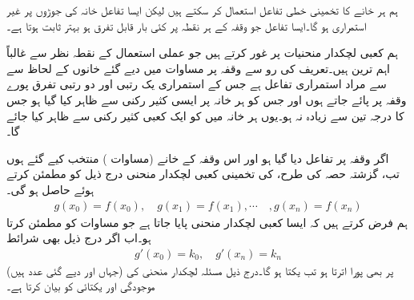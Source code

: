ہم ہر خانے  کا تخمینی خطی تفاعل استعمال کر سکتے ہیں لیکن ایسا تفاعل خانہ کی جوڑوں پر غیر استمراری ہو گا۔ایسا تفاعل جو وقفہ  کے ہر نقطہ پر کئی بار قابل تفرق ہو  بہتر ثابت ہوتا ہے۔

ہم کعبی لچکدار منحنیات پر غور کرتے ہیں جو عملی استعمال کے نقطہ نظر سے غالباً اہم ترین ہیں۔تعریف کی رو سے وقفہ  پر مساوات  میں دیے گئے خانوں کے لحاظ سے     سے مراد استمراری تفاعل  ہے جس کے  استمراری یک رتبی اور دو رتبی تفرق پورے وقفہ پر پائے جاتے ہوں اور جس کو ہر خانہ پر ایسی  کثیر رکنی سے ظاہر کیا گیا ہو جس کا درجہ تین سے زیادہ نہ ہو۔یوں ہر خانہ میں  کو ایک کعبی کثیر رکنی سے ظاہر کیا جائے گا۔

اگر وقفہ  پر تفاعل  دیا گیا ہو اور اس وقفہ کے خانے (مساوات ) منتخب کیے گئے ہوں تب، گزشتہ حصہ کی طرح،    کی تخمینی کعبی لچکدار منحنی  درج ذیل کو مطمئن کرتے ہوئے حاصل ہو گی۔
\begin{align}\label{مساوات_اعدادی_لچکدار_منحنی_ٹکڑے_ب}
g(x_0)=f(x_0),\quad g(x_1)=f(x_1),\cdots \quad, g(x_n)=f(x_n)
\end{align}
ہم فرض کرتے ہیں کہ ایسا کعبی لچکدار منحنی  پایا جاتا ہے جو مساوات  کو مطمئن کرتا  ہو۔اب اگر  درج ذیل بھی شرائط 
\begin{align}\label{مساوات_اعدادی_لچکدار_منحنی_ٹکڑے_پ}
g'(x_0)=k_0,\quad g'(x_n)=k_n
\end{align}
(جہاں  اور  دیے گئی عدد ہیں) پر بھی پورا اترتا ہو تب  یکتا ہو گا۔درج ذیل مسئلہ لچکدار منحنی کی موجودگی اور یکتائی کو بیان کرتا ہے۔

